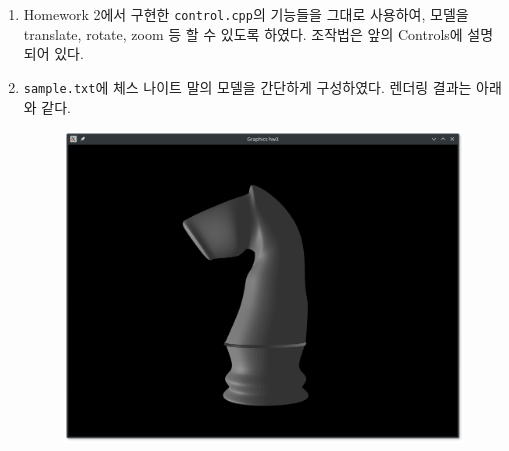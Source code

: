 \documentclass[11pt]{oblivoir}
\begin{document}
\begin{enumerate}
\begin{figure}[H]
  \end{figure}
\item
  Homework 2에서 구현한 \verb|control.cpp|의 기능들을 그대로 사용하여, 모델을 translate, rotate, zoom 등 할 수 있도록 하였다. 조작법은 앞의 Controls에 설명되어 있다.
\item
  \verb|sample.txt|에 체스 나이트 말의 모델을 간단하게 구성하였다. 렌더링 결과는 아래와 같다.
  \begin{figure}[H]
    \centering
    \includegraphics[width=0.75\linewidth]{knight.png}
  \end{figure}
\end{enumerate}
\end{document}
